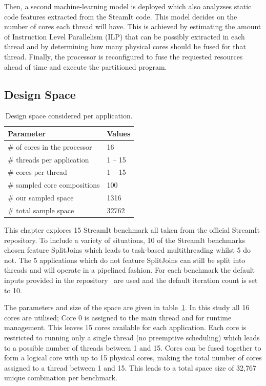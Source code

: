 Then, a second machine-learning model is deployed which also analyzses static code features extracted from the SteamIt code.
This model decides on the number of cores each thread will have.
This is achieved by estimating the amount of Instruction Level Parallelism (ILP) that can be possibly extracted in each thread and by determining how many physical cores should be fused for that thread.
Finally, the processor is reconfigured to fuse the requested resources ahead of time and execute the partitioned program.

\subsection{Design Space}

\begin{table}
\centering
\begin{tabular} { p{5.2cm}  p{1.8cm} }
      \toprule
      \textbf{Parameter} & \textbf{Values} \\ \midrule
      \# of cores in the processor & 16 \\
      \# threads per application & 1 -- 15 \\
      \# cores per thread & 1 -- 15 \\ \midrule
      \# sampled core compositions & 100 \\ 
      \# our sampled space & 1316 \\
      \# total sample space & 32762 \\ \bottomrule
    \end{tabular}
  \caption{Design space considered per application.}
  \label{tab:space}
\end{table}

This chapter explores 15 StreamIt benchmark all taken from the official StreamIt repository.
To include a variety of situations, 10 of the StreamIt benchmarks chosen feature SplitJoins which leads to task-based multithreading whilst 5 do not.
The 5 applications which do not feature SplitJoins can still be split into threads and will operate in a pipelined fashion.
For each benchmark the default inputs provided in the repository~\cite{streamitrepo} are used and the default iteration count is set to 10. 

The parameters and size of the space are given in table~\ref{tab:space}.
In this study all 16 cores are utilised; Core 0 is assigned to the main thread and for runtime management. 
This leaves 15 cores available for each application.
Each core is restricted to running only a single thread (no preemptive scheduling) which leads to a possible number of threads between 1 and 15.
Cores can be fused together to form a logical core with up to 15 physical cores, making the total number of cores assigned to a thread between 1 and 15.
This leads to a total space size of 32,767 unique combination per benchmark.

